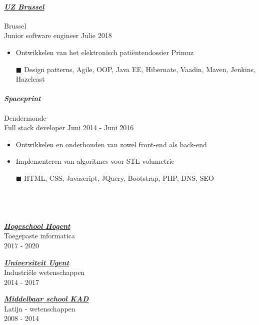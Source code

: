 \documentclass[a4paper, twoside]{article}
\begin{document}
\paragraph{\textbf{\textit{\href{https://uzbrussel.be/}{\textcolor{blueDark}{UZ Brussel}}}}} \hfill\small Brussel\\
Junior software engineer \hfill\small Julie 2018
\begin{itemize}
    \itemsep-0.2em 
    \item Ontwikkelen van het elektronisch patiëntendossier Primuz
    \item[\color{orange}$\blacksquare$] Design patterns, Agile, OOP, Java EE, Hibernate, Vaadin, Maven, Jenkins, Hazelcast
\end{itemize}

\paragraph{\textbf{\textit{\textcolor{blueDark}{Spaceprint}}}} \hfill\small Dendermonde\\
Full stack developer \hfill\small Juni 2014 - Juni 2016
\begin{itemize}
    \itemsep-0.2em 
    \item Ontwikkelen en onderhouden van zowel front-end als back-end
    \item Implementeren van algoritmes voor STL-volumetrie
    \item[\color{orange}$\blacksquare$] HTML, CSS, Javascript, JQuery, Bootstrap, PHP, DNS, SEO
\end{itemize}

\begin{mdframed}
\section*{\textcolor{white}{Opleiding}}
\end{mdframed}

\begin{multicols}{3}
    \noindent\textbf{\textit{\href{https://hogent.be/}{\textcolor{blueDark}{Hogeschool Hogent}}}}\\
    Toegepaste informatica\\ \small 2017 - 2020

    \noindent\textbf{\textit{\href{https://ugent.be/}{\textcolor{blueDark}{Universiteit Ugent}}}}\\
    Industriële wetenschappen\\ \small 2014 - 2017

    \noindent\textbf{\textit{\href{http://kad.be/}{\textcolor{blueDark}{Middelbaar school KAD}}}}\\
    Latijn - wetenschappen\\ \small 2008 - 2014  
\end{multicols}
\end{document}

